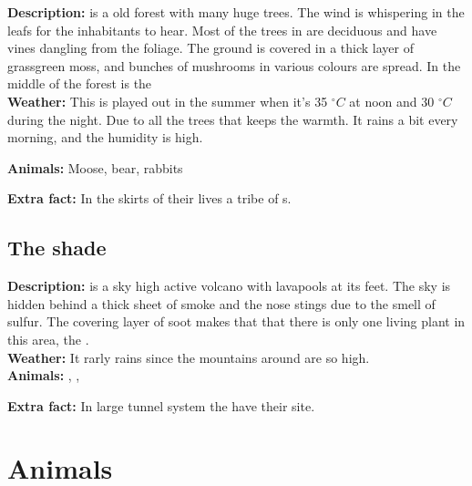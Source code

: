 \documentclass{article}
\begin{document}
\textbf{Description:}  is a old forest with many huge trees. The wind is whispering in the leafs for the inhabitants to hear. Most of the trees in  are deciduous and have vines dangling from the foliage. The ground is covered in a thick layer of grassgreen moss, and bunches of mushrooms in various colours are spread. In the middle of the forest is the \\
\textbf{Weather:} This is played out in the summer when it's 35 $^\circ C$ at noon and 30 $^\circ C$ during the night. Due to all the trees that keeps the warmth. It rains a bit every morning, and the humidity is high.


\textbf{Animals:} Moose, bear, rabbits

\textbf{Extra fact:} In the skirts of  their lives a tribe of s.
\subsection{The shade}
\label{volcano1}
\textbf{Description:}  is a sky high active volcano with lavapools at its feet. The sky is hidden behind a thick sheet of smoke and the nose stings due to the smell of sulfur. The covering layer of soot makes that that there is only one living plant in this area, the .
\\\textbf{Weather:} It rarly rains since the mountains around are so high.
\\\textbf{Animals:} , ,  

\textbf{Extra fact:} In large tunnel system the  have their site.

\section{Animals}%
\end{document}
